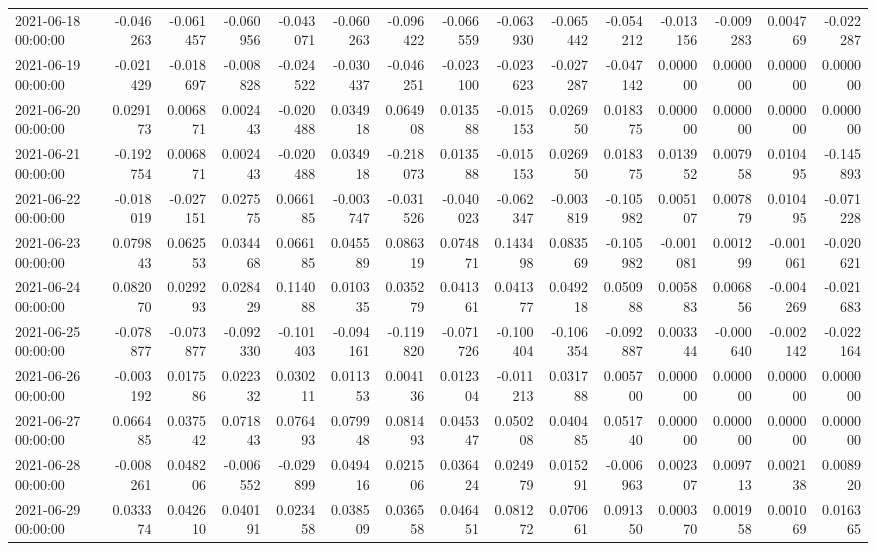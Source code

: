 \begin{tabular}{lrrrrrrrrrrrrrr}
2021-06-18 00:00:00 & -0.046263 & -0.061457 & -0.060956 & -0.043071 & -0.060263 & -0.096422 & -0.066559 & -0.063930 & -0.065442 & -0.054212 & -0.013156 & -0.009283 & 0.004769 & -0.022287 \\
2021-06-19 00:00:00 & -0.021429 & -0.018697 & -0.008828 & -0.024522 & -0.030437 & -0.046251 & -0.023100 & -0.023623 & -0.027287 & -0.047142 & 0.000000 & 0.000000 & 0.000000 & 0.000000 \\
2021-06-20 00:00:00 & 0.029173 & 0.006871 & 0.002443 & -0.020488 & 0.034918 & 0.064908 & 0.013588 & -0.015153 & 0.026950 & 0.018375 & 0.000000 & 0.000000 & 0.000000 & 0.000000 \\
2021-06-21 00:00:00 & -0.192754 & 0.006871 & 0.002443 & -0.020488 & 0.034918 & -0.218073 & 0.013588 & -0.015153 & 0.026950 & 0.018375 & 0.013952 & 0.007958 & 0.010495 & -0.145893 \\
2021-06-22 00:00:00 & -0.018019 & -0.027151 & 0.027575 & 0.066185 & -0.003747 & -0.031526 & -0.040023 & -0.062347 & -0.003819 & -0.105982 & 0.005107 & 0.007879 & 0.010495 & -0.071228 \\
2021-06-23 00:00:00 & 0.079843 & 0.062553 & 0.034468 & 0.066185 & 0.045589 & 0.086319 & 0.074871 & 0.143498 & 0.083569 & -0.105982 & -0.001081 & 0.001299 & -0.001061 & -0.020621 \\
2021-06-24 00:00:00 & 0.082070 & 0.029293 & 0.028429 & 0.114088 & 0.010335 & 0.035279 & 0.041361 & 0.041377 & 0.049218 & 0.050988 & 0.005883 & 0.006856 & -0.004269 & -0.021683 \\
2021-06-25 00:00:00 & -0.078877 & -0.073877 & -0.092330 & -0.101403 & -0.094161 & -0.119820 & -0.071726 & -0.100404 & -0.106354 & -0.092887 & 0.003344 & -0.000640 & -0.002142 & -0.022164 \\
2021-06-26 00:00:00 & -0.003192 & 0.017586 & 0.022332 & 0.030211 & 0.011353 & 0.004136 & 0.012304 & -0.011213 & 0.031788 & 0.005700 & 0.000000 & 0.000000 & 0.000000 & 0.000000 \\
2021-06-27 00:00:00 & 0.066485 & 0.037542 & 0.071843 & 0.076493 & 0.079948 & 0.081493 & 0.045347 & 0.050208 & 0.040485 & 0.051740 & 0.000000 & 0.000000 & 0.000000 & 0.000000 \\
2021-06-28 00:00:00 & -0.008261 & 0.048206 & -0.006552 & -0.029899 & 0.049416 & 0.021506 & 0.036424 & 0.024979 & 0.015291 & -0.006963 & 0.002307 & 0.009713 & 0.002138 & 0.008920 \\
2021-06-29 00:00:00 & 0.033374 & 0.042610 & 0.040191 & 0.023458 & 0.038509 & 0.036558 & 0.046451 & 0.081272 & 0.070661 & 0.091350 & 0.000370 & 0.001958 & 0.001069 & 0.016365 \\

\end{tabular}
